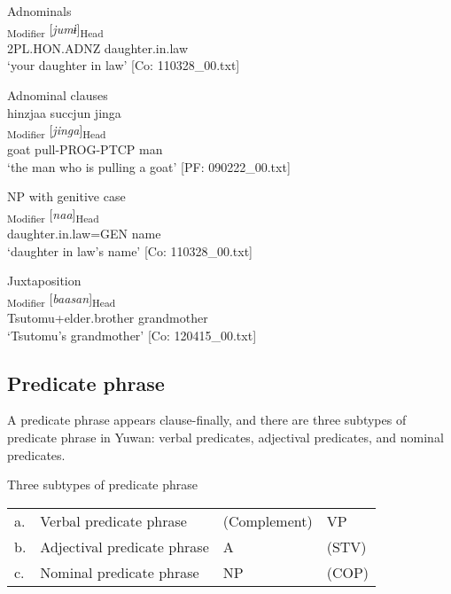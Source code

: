 \ea\label{ex:4.3} 
\ea Adnominals\label{ex:4.3a}\\
 \textsubscript{Modifier}  [\textit{jumɨ}]\textsubscript{Head}\\
      2PL.HON.ADNZ  daughter.in.law\\
      \glt ‘your daughter in law’   [Co: 110328\_00.txt]

\ex\label{ex:4.3b} Adnominal clauses\\
\glll      hinzjaa  succjun  jinga\\
      [\textit{hinzjaa}  \textit{sukk-tur-n}]\textsubscript{Modifier}  [\textit{jinga}]\textsubscript{Head}\\
      goat  pull-PROG-PTCP  man\\
      \glt       ‘the man who is pulling a goat’ [PF: 090222\_00.txt]

\ex\label{ex:4.3c}  NP with genitive case\\
    \gll  [\textit{jumɨ=nu}]\textsubscript{Modifier}  [\textit{naa}]\textsubscript{Head}\\
      daughter.in.law=GEN  name\\
      \glt       ‘daughter in law’s name’ [Co: 110328\_00.txt]

\ex\label{ex:4.3d} Juxtaposition\\
    \textsubscript{Modifier}  [\textit{baasan}]\textsubscript{Head}\\
      Tsutomu+elder.brother  grandmother\\
      \glt       ‘Tsutomu’s grandmother’ [Co: 120415\_00.txt]
\z
\z

\subsection{Predicate phrase}\label{sec:4.1.3}

A predicate phrase appears clause-finally, and there are three subtypes of predicate phrase in Yuwan: verbal predicates, adjectival predicates, and nominal predicates.

\ea Three subtypes of predicate phrase\\\label{ex:4.4}
\begin{tabular}{@{}l@{ }lll@{}}
  a. & Verbal predicate phrase     & (Complement) &  VP\footnotemark[1] \\
  b. & Adjectival predicate phrase &    A\footnotemark[2]         & (STV\footnotemark[3])\\
  c. & Nominal predicate phrase    &  NP          & (COP\footnotemark[4])\\
\end{tabular}
\z
{}


